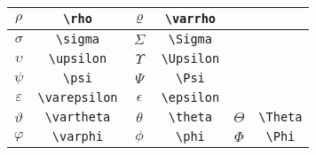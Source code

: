 \documentclass[a4paper,12pt]{standalone}
\begin{document}
\begin{tabular}{cccccc}
    \(\rho\)        & \verb|\rho| & \(\varrho\)  & \verb|\varrho| &            &                         \\ \midrule
    \(\sigma\)      & \verb|\sigma| & \(\Sigma\)   & \verb|\Sigma| &            &                         \\ \midrule
    \(\upsilon\)    & \verb|\upsilon| & \(\Upsilon\) & \verb|\Upsilon| &            &                         \\ \midrule
    \(\psi\)        & \verb|\psi| & \(\Psi\)     & \verb|\Psi| &            &                         \\ \midrule
    \(\varepsilon\) & \verb|\varepsilon| & \(\epsilon\) & \verb|\epsilon| &            &                         \\ \midrule
    \(\vartheta\)   & \verb|\vartheta| & \(\theta\)   & \verb|\theta| & \(\Theta\) & \verb|\Theta| \\ \midrule
    \(\varphi\)     & \verb|\varphi| & \(\phi\)     & \verb|\phi| & \(\Phi\)   & \verb|\Phi| \\ \bottomrule
\end{tabular}
\end{document}
